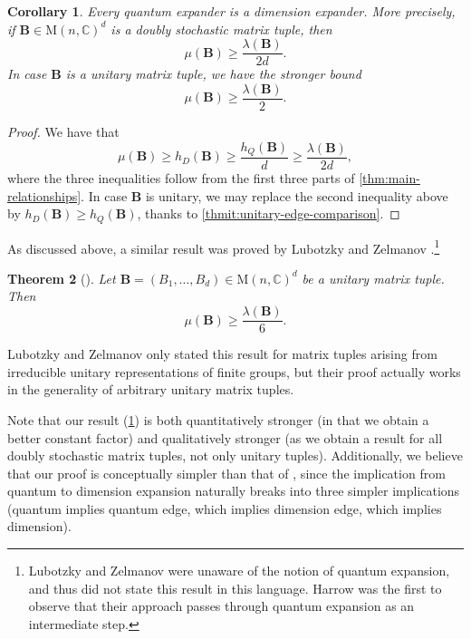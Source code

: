 \documentclass[11pt]{article}
\newtheorem{theorem}{Theorem}[section]
\newtheorem{corollary}[theorem]{Corollary}
\theoremstyle{plain}
\numberwithin{equation}{section}
\theoremstyle{definition}
\newcommand{\bC}{\mathbb{C}}
\newcommand{\M}{\mathrm{M}}
\newcommand{\tuple}[1]{\mathbf{#1}}
\newcommand{\vB}{\tuple{B}}
\begin{document}
\begin{corollary}\label{cor:quantum-dimension}
    Every quantum expander is a dimension expander. More precisely, if $\vB \in \M(n,\bC)^d$ is a doubly stochastic matrix tuple, then
    \[
        \mu(\vB) \geq  \frac{\lambda(\vB)}{2d}.
    \]
    In case $\vB$ is a unitary matrix tuple, we have the stronger bound
    \[
        \mu(\vB) \geq  \frac{\lambda(\vB)}{2}.
    \]
\end{corollary}
\begin{proof}
    We have that
    \[
        \mu(\vB) \geq  h_D(\vB) \geq  \frac{h_Q(\vB)}{d} \geq  \frac{\lambda(\vB)}{2d},
    \]
    where the three inequalities follow from the first three parts of \cref{thm:main-relationships}. In case $\vB$ is unitary, we may replace the second inequality above by $h_D(\vB) \geq  h_Q(\vB)$, thanks to \cref{thmit:unitary-edge-comparison}.
\end{proof}

As discussed above, a similar result was proved by Lubotzky and Zelmanov \cite{LUBOTZKY2008730}.\footnote{Lubotzky and Zelmanov were unaware of the notion of quantum expansion, and thus did not state this result in this language. Harrow \cite{Harrow08} was the first to observe that their approach passes through quantum expansion as an intermediate step.}
\begin{theorem}[{\cite[Proposition 2.1]{LUBOTZKY2008730}}]\label{thm:LZ}
    Let $\vB=(B_1,\dots,B_d)\in\mathrm{M}(n,\bC)^d$ be a unitary matrix tuple. Then
    $$\mu(\vB) \geq \frac{\lambda(\vB)}{6}.$$
\end{theorem}
Lubotzky and Zelmanov only stated this result for matrix tuples arising from irreducible unitary representations of finite groups, but their proof actually works in the generality of arbitrary unitary matrix tuples. 

Note that our result (\cref{cor:quantum-dimension}) is both quantitatively stronger (in that we obtain a better constant factor) and qualitatively stronger (as we obtain a result for all doubly stochastic matrix tuples, not only unitary tuples). Additionally, we believe that our proof is conceptually simpler than that of \cite{LUBOTZKY2008730}, since the implication from quantum to dimension expansion naturally breaks into three simpler implications (quantum implies quantum edge, which implies dimension edge, which implies dimension).
\end{document}
